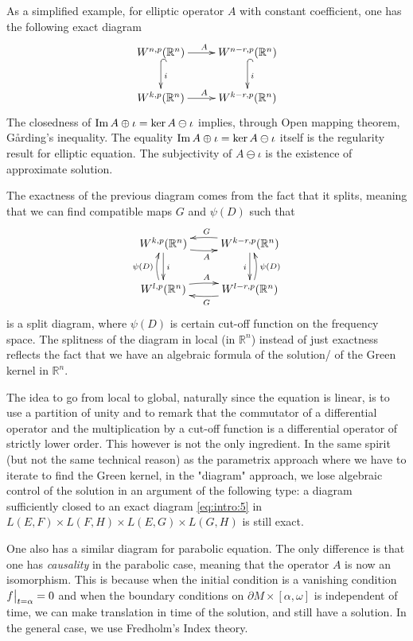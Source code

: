 As a simplified example, for elliptic operator \(A\) with constant coefficient, one
has the following exact diagram
\[
\xymatrix{
W^{n,p}(\mathbb{R}^n) \ar@{->}[r]^{A} \ar@{^{(}->}[d]^{i} & W^{n-r,p}(\mathbb{R}^n) \ar@{^{(}->}[d]^{i} \\
W^{k,p}(\mathbb{R}^n) \ar@{->}[r]^{A} & W^{k-r,p}(\mathbb{R}^n)
}
\]
The closedness of \(\mathop{\rm Im}\nolimits A\oplus \iota = \ker A\ominus \iota\) implies, through Open
mapping theorem, Gårding's inequality. The equality \(\mathop{\rm Im}\nolimits A\oplus \iota = \ker A\ominus
\iota\) itself is the regularity result for elliptic equation. The subjectivity of \(A\ominus\iota\) is the existence of approximate solution.

The exactness of the previous diagram comes from the fact that it splits, meaning that we
can find compatible maps \(G\) and \(\psi(D)\) such that
\[
\xymatrix{
W^{k,p}(\mathbb{R}^n) \ar@/_/@{->}[r]_{A} \ar@{->}[d]^{i} & W^{k-r,p}(\mathbb{R}^n) \ar@{->}[d]_{i} \ar@/_/@{->}[l]_{G} \\
W^{l,p}(\mathbb{R}^n) \ar@/^/@{->}[r]^{A} \ar@/^/@{->}[u]^{\psi(D)} & W^{l-r,p}(\mathbb{R}^n) \ar@/^/@{->}[l]^{G} \ar@/_/@{->}[u]_{\psi(D)}
}
\]
is a split diagram, where \(\psi(D)\) is certain cut-off function on the frequency
space. The splitness of the diagram in local (in \(\mathbb{R}^n\)) instead of just
exactness reflects the fact that we have an algebraic formula of the solution/ of the
Green kernel in \(\mathbb{R}^n\).

The idea to go from local to global, naturally since the equation is linear, is to use a
partition of unity and to remark that the commutator of a differential operator and the
multiplication by a cut-off function is a differential operator of strictly lower
order. This however is not the only ingredient. In the same spirit (but not the same technical reason) as the parametrix
approach where we have to iterate to find the Green kernel, in the "diagram" approach,
we lose algebraic control of the solution in an argument of the following type: a diagram
sufficiently closed to an exact diagram \eqref{eq:intro:5} in \(L(E,F)\times L(F,H)\times
L(E,G)\times L(G,H)\) is still exact.

One also has a similar diagram for parabolic equation. The only difference is that one has
\emph{causality} in the parabolic case, meaning that the operator \(A\) is now an
isomorphism. This is because when
the initial condition is a vanishing condition \(\restr{f}{t=\alpha}=0\) and when the
boundary conditions on \(\partial M \times [\alpha,\omega]\) is independent of time, we
can make translation in time of the solution, and still have a solution. In the general
case, we use Fredholm's Index theory.

